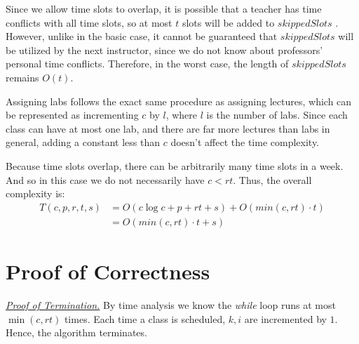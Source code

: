 \documentclass[11pt, oneside]{article}   	%
\begin{document}
Since we allow time slots to overlap, it is possible that a teacher has time conflicts with all time slots, so at most $t$ slots will be added to $skippedSlots$ . However, unlike in the basic case, it cannot be guaranteed that $skippedSlots$ will be utilized by the next instructor, since we do not know about professors' personal time conflicts. Therefore, in the worst case, the length of $skippedSlots$ remains $O(t)$.\par
Assigning labs follows the exact same procedure as assigning lectures, which can be represented as incrementing $c$ by $l$, where $l$ is the number of labs. Since each class can have at most one lab, and there are far more lectures than labs in general, adding a constant less than $c$ doesn't affect the time complexity. \par
Because time slots overlap, there can be arbitrarily many time slots in a week. And so in this case we do not necessarily have $c<rt$. Thus, the overall complexity is:
\begin{align*}T(c, p, r, t, s)& =  O(c\log c + p + rt + s) + O(min(c, rt)\cdot t)\\
& = O(min(c, rt)\cdot t+s)\end{align*}


\section{Proof of Correctness}
\underline{\textit{Proof of Termination.}} By time analysis we know the {\it while} loop runs at most $\min(c, rt)$ times. Each time a class is scheduled, $k, i$ are incremented by $1$. Hence, the algorithm terminates.
\end{document}

